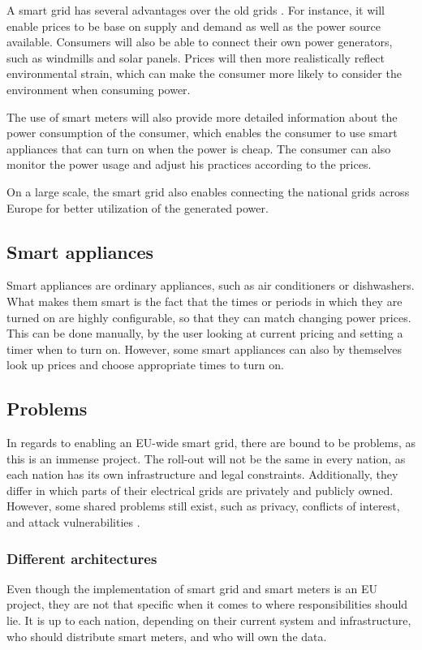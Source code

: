 A smart grid has several advantages over the old grids \cite{smartgrid_gov, directive_2009_72_EC}.
For instance, it will enable prices to be base on supply and demand as well as the power source available.
Consumers will also be able to connect their own power generators, such as windmills and solar panels.
Prices will then more realistically reflect environmental strain, which can make the consumer more likely to consider the environment when consuming power.

The use of smart meters will also provide more detailed information about the power consumption of the consumer, which enables the consumer to use smart appliances that can turn on when the power is cheap.
The consumer can also monitor the power usage and adjust his practices according to the prices.

On a large scale, the smart grid also enables connecting the national grids across Europe for better utilization of the generated power.


\subsection{Smart appliances}
\label{background:smart_appliances}
Smart appliances\cite{smart_appliances} are ordinary appliances, such as air conditioners or dishwashers.
What makes them smart is the fact that the times or periods in which they are turned on are highly configurable, so that they can match changing power prices.
This can be done manually, by the user looking at current pricing and setting a timer when to turn on.
However, some smart appliances can also by themselves look up prices and choose appropriate times to turn on.

\subsection{Problems}
In regards to enabling an EU-wide smart grid, there are bound to be problems, as this is an immense project.
The roll-out will not be the same in every nation, as each nation has its own infrastructure and legal constraints.
Additionally, they differ in which parts of their electrical grids are privately and publicly owned.
However, some shared problems still exist, such as privacy, conflicts of interest, and attack vulnerabilities \cite{offswitch, smart_meter_survey, security_economics}.

\subsubsection{Different architectures}
Even though the implementation of smart grid and smart meters is an EU project, they are not that specific when it comes to where responsibilities should lie.
It is up to each nation, depending on their current system and infrastructure, who should distribute smart meters, and who will own the data.

